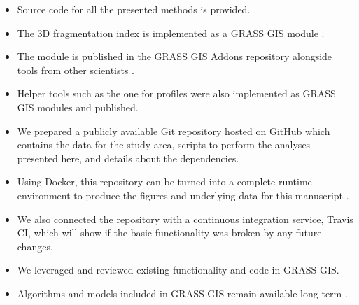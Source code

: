 \documentclass[25pt, margin=0mm, innermargin=15mm, blockverticalspace=15mm, colspace=15mm, subcolspace=8mm]{tikzposter}
\newcommand{\blocktitlewrap}[1]{\textsf{\textbf{\huge#1}}}
\begin{document}
\begin{columns}
{\begin{itemize}
 \item Source code for all the presented methods is provided.
 \item The 3D fragmentation index is implemented as a GRASS GIS module \citep{neteler2012grass}.
 \item The module is published in the GRASS GIS Addons repository
       alongside tools from other scientists \citep{chemin2015grass}.
 \item Helper tools such as the one for profiles were also implemented as GRASS GIS modules and published.
 \item We prepared a publicly available Git repository hosted on GitHub
       which contains the data for the study area, scripts to perform the analyses presented here,
       and details about the dependencies.
 \item Using Docker, this repository can be turned into a complete runtime environment
       to produce the figures and underlying data for this manuscript \citep{boettiger2015introduction}.
 \item We also connected the repository with a continuous integration service, Travis CI,
       which will show if the basic functionality was broken by any future changes.
 \item We leveraged and reviewed existing functionality and code in GRASS GIS.
 \item Algorithms and models included in GRASS GIS remain available long term \citep{petras2017innovations}.
\end{itemize}

}

\block{\blocktitlewrap{References}}{

\newcommand{\blocksectiontitle}[1]{\bigskip\textbf{\textcolor{gray}{\textsf{#1}}}}

\newcommand{\listhspace}{\hspace{0.005\linewidth}}
\newcommand{\listlogowidth}{0.10\linewidth}
\newcommand{\listtextwidth}{0.89\linewidth}

\blocksectiontitle{Literature}
\begingroup
\scriptsize
\renewcommand{\section}[2]{}%


\endgroup


}
\end{columns}
\end{document}
